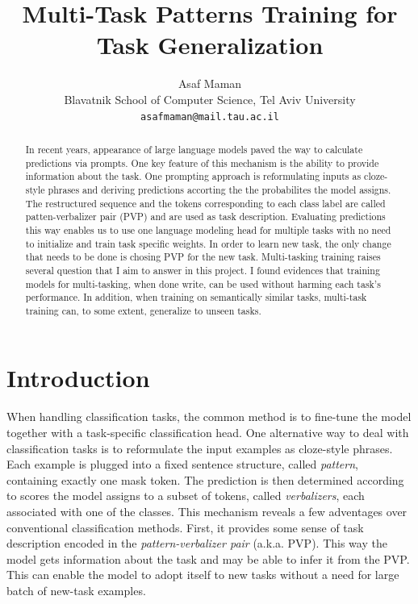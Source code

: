 \documentclass[11pt,a4paper]{article}
\title{Multi-Task Patterns Training for Task Generalization}
\author{Asaf Maman \\
  Blavatnik School of Computer Science, Tel Aviv University \\
  \texttt{asafmaman@mail.tau.ac.il} \\}
\date{}
\begin{document}
\maketitle

\begin{abstract}
In recent years, appearance of large language models paved the way to calculate predictions via prompts.
One key feature of this mechanism is the ability to provide information about the task.
One prompting approach is reformulating inputs as cloze-style phrases and deriving predictions accorting the the probabilites the model assigns.
The restructured sequence and the tokens corresponding to each class label are called patten-verbalizer pair (PVP) and are used as task description.
Evaluating predictions this way enables us to use one language modeling head for multiple tasks with no need to initialize and train task specific weights.
In order to learn new task, the only change that needs to be done is chosing PVP for the new task. 
Multi-tasking training raises several question that I aim to answer in this project.
I found evidences that training models for multi-tasking, when done write, can be used without harming each task's performance.
In addition, when training on semantically similar tasks, multi-task training can, to some extent, generalize to unseen tasks.
\end{abstract}


\section{Introduction}

When handling classification tasks, the common method is to fine-tune the model together with a task-specific classification head.
One alternative way to deal with classification tasks is to reformulate the input examples as cloze-style phrases.
Each example is plugged into a fixed sentence structure, called \textit{pattern}, containing exactly one mask token.
The prediction is then determined according to scores the model assigns to a subset of tokens, called \textit{verbalizers}, each associated with one of the classes.
This mechanism reveals a few adventages over conventional classification methods.
First, it provides some sense of task description encoded in the \textit{pattern-verbalizer pair} (a.k.a. PVP).
This way the model gets information about the task and may be able to infer it from the PVP.
This can enable the model to adopt itself to new tasks without a need for large batch of new-task examples.
\end{document}
